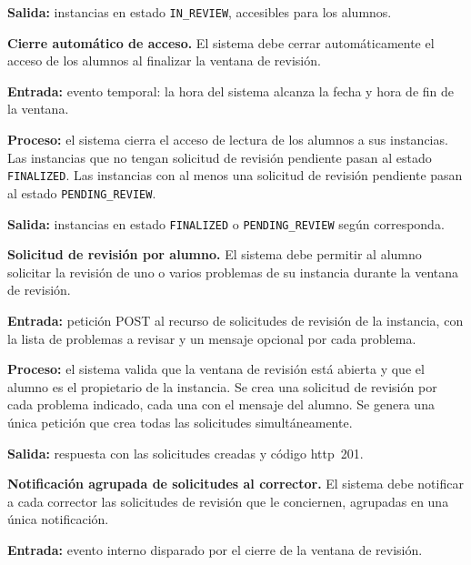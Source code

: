 \begin{functional}
    \textbf{Salida:} instancias en estado \texttt{IN\_REVIEW}, accesibles para los alumnos.

    \item \textbf{Cierre automático de acceso.} \label{rf:review:close}
    El sistema debe cerrar automáticamente el acceso de los alumnos al finalizar la ventana
    de revisión.

    \textbf{Entrada:} evento temporal: la hora del sistema alcanza la fecha y hora de fin de
    la ventana.

    \textbf{Proceso:} el sistema cierra el acceso de lectura de los alumnos a sus
    instancias. Las instancias que no tengan solicitud de revisión pendiente pasan al estado
    \texttt{FINALIZED}. Las instancias con al menos una solicitud de revisión pendiente
    pasan al estado \texttt{PENDING\_REVIEW}.

    \textbf{Salida:} instancias en estado \texttt{FINALIZED} o \texttt{PENDING\_REVIEW}
    según corresponda.

    \item \textbf{Solicitud de revisión por alumno.} \label{rf:review:request}
    El sistema debe permitir al alumno solicitar la revisión de uno o varios problemas de su
    instancia durante la ventana de revisión.

    \textbf{Entrada:} petición POST al recurso de solicitudes de revisión de la instancia,
    con la lista de problemas a revisar y un mensaje opcional por cada problema.

    \textbf{Proceso:} el sistema valida que la ventana de revisión está abierta y que el
    alumno es el propietario de la instancia. Se crea una solicitud de revisión por cada
    problema indicado, cada una con el mensaje del alumno. Se genera una única petición que
    crea todas las solicitudes simultáneamente.

    \textbf{Salida:} respuesta con las solicitudes creadas y código \acs{http}~201.

    \item \textbf{Notificación agrupada de solicitudes al corrector.}
    \label{rf:review:notify}
    El sistema debe notificar a cada corrector las solicitudes de revisión que le
    conciernen, agrupadas en una única notificación.

    \textbf{Entrada:} evento interno disparado por el cierre de la ventana de revisión.


\end{functional}
